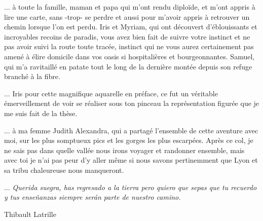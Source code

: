 $\hdots$ à toute la famille, maman et papa qui m’ont rendu diploïde, et m’ont appris à lire une carte, sans -trop- se perdre et aussi pour m’avoir appris à retrouver un chemin lorsque l'on est perdu.
Iris et Myriam, qui ont découvert d’éblouissants et incroyables recoins de paradis, vous avez bien fait de suivre votre instinct et ne pas avoir suivi la route toute tracée, instinct qui ne vous aurez certainement pas amené à élire domicile dans vos oasis si hospitalières et bourgeonnantes.
Samuel, qui m’a ravitaillé en patate tout le long de la dernière montée depuis son refuge branché à la fibre.

$\hdots$ Iris pour cette magnifique aquarelle en préface, ce fut un véritable émerveillement de voir se réaliser sous ton pinceau la représentation figurée que je me suis fait de la thèse.

$\hdots$ à ma femme Judith Alexandra, qui a partagé l’ensemble de cette aventure avec moi, sur les plus somptueux pics et les gorges les plus escarpées.
Après ce col, je ne sais pas dans quelle vallée nous irons voyager et randonner ensemble, mais avec toi je n’ai pas peur d’y aller même si nous savons pertinemment que Lyon et sa tribu chaleureuse nous manqueront.

$\hdots$ \textit{Querida suegra, has regresado a la tierra pero quiero que sepas que tu recuerdo y tus enseñanzas siempre serán parte de nuestro camino.}

\begin{flushright}
    Thibault Latrille
\end{flushright}
